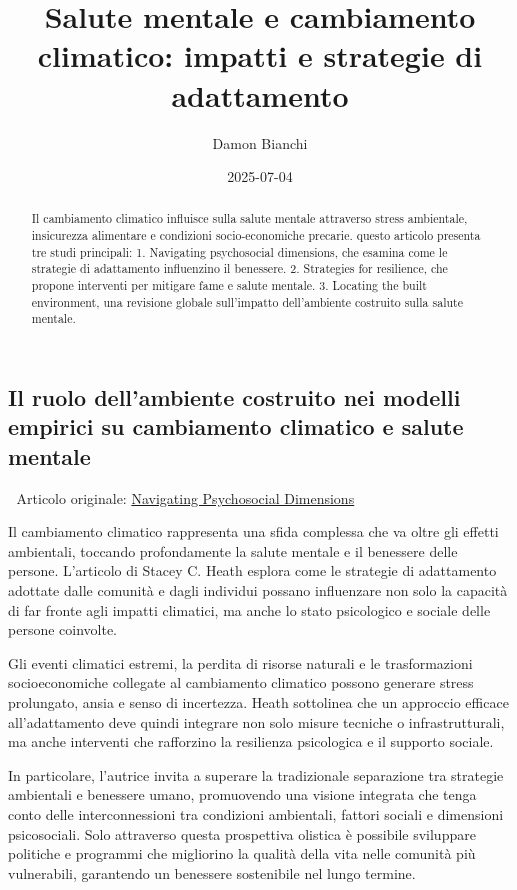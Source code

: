 \documentclass[
]{article}
\title{Salute mentale e cambiamento climatico: impatti e strategie di
adattamento}
\author{Damon Bianchi}
\date{2025-07-04}
\begin{document}
\maketitle
\begin{abstract}
Il cambiamento climatico influisce sulla salute mentale attraverso
stress ambientale, insicurezza alimentare e condizioni socio-economiche
precarie. questo articolo presenta tre studi principali: 1. Navigating
psychosocial dimensions, che esamina come le strategie di adattamento
influenzino il benessere. 2. Strategies for resilience, che propone
interventi per mitigare fame e salute mentale. 3. Locating the built
environment, una revisione globale sull'impatto dell'ambiente costruito
sulla salute mentale.
\end{abstract}

\subsection{Il ruolo dell'ambiente costruito nei modelli empirici su
cambiamento climatico e salute
mentale}\label{il-ruolo-dellambiente-costruito-nei-modelli-empirici-su-cambiamento-climatico-e-salute-mentale}

📄 Articolo originale:
\href{https://www.sciencedirect.com/science/article/pii/S1877343524000800}{Navigating
Psychosocial Dimensions}

Il cambiamento climatico rappresenta una sfida complessa che va oltre
gli effetti ambientali, toccando profondamente la salute mentale e il
benessere delle persone. L'articolo di Stacey C. Heath esplora come le
strategie di adattamento adottate dalle comunità e dagli individui
possano influenzare non solo la capacità di far fronte agli impatti
climatici, ma anche lo stato psicologico e sociale delle persone
coinvolte.

Gli eventi climatici estremi, la perdita di risorse naturali e le
trasformazioni socioeconomiche collegate al cambiamento climatico
possono generare stress prolungato, ansia e senso di incertezza. Heath
sottolinea che un approccio efficace all'adattamento deve quindi
integrare non solo misure tecniche o infrastrutturali, ma anche
interventi che rafforzino la resilienza psicologica e il supporto
sociale.

In particolare, l'autrice invita a superare la tradizionale separazione
tra strategie ambientali e benessere umano, promuovendo una visione
integrata che tenga conto delle interconnessioni tra condizioni
ambientali, fattori sociali e dimensioni psicosociali. Solo attraverso
questa prospettiva olistica è possibile sviluppare politiche e programmi
che migliorino la qualità della vita nelle comunità più vulnerabili,
garantendo un benessere sostenibile nel lungo termine.
\end{document}
